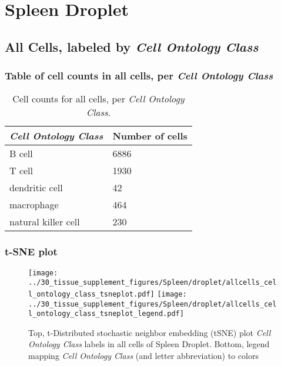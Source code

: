 \clearpage
\section{Spleen Droplet}

\subsection{All Cells, labeled by \emph{Cell Ontology Class}}
\subsubsection{Table of cell counts in all cells, per \emph{Cell Ontology Class}}\begin{table}[h]
\centering
\label{my-label}
\begin{tabular}{@{}ll@{}}
\toprule

\emph{Cell Ontology Class}& Number of cells \\ \midrule
B cell & 6886 \\

T cell & 1930 \\

dendritic cell & 42 \\

macrophage & 464 \\

natural killer cell & 230 \\
\bottomrule
\end{tabular}
\caption{Cell counts for all cells, per \emph{Cell Ontology Class}.}
\end{table}

\clearpage
\subsubsection{t-SNE plot}
\begin{figure}[h]
\centering
\texttt{[image: ../30\_tissue\_supplement\_figures/Spleen/droplet/allcells\_cell\_ontology\_class\_tsneplot.pdf]}
\texttt{[image: ../30\_tissue\_supplement\_figures/Spleen/droplet/allcells\_cell\_ontology\_class\_tsneplot\_legend.pdf]}
\caption{Top, t-Distributed stochastic neighbor embedding (tSNE) plot  \emph{Cell Ontology Class} labels in all cells of Spleen Droplet. Bottom, legend mapping \emph{Cell Ontology Class} (and letter abbreviation) to colors}
\end{figure}


\clearpage

